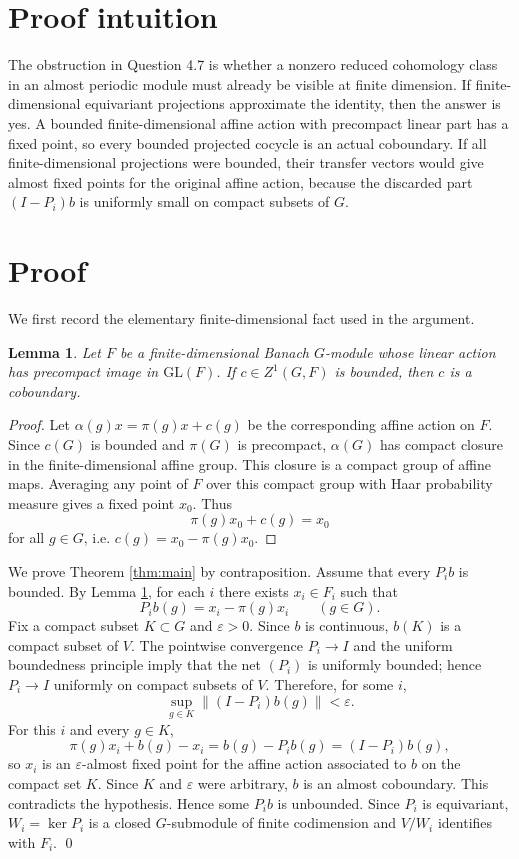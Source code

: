 \documentclass[11pt]{article}
\newtheorem{lemma}{Lemma}
\newcommand{\Zone}{Z^1}
\begin{document}
\section*{Proof intuition}

The obstruction in Question 4.7 is whether a nonzero reduced cohomology class in
an almost periodic module must already be visible at finite dimension.  If
finite-dimensional equivariant projections approximate the identity, then the
answer is yes.  A bounded finite-dimensional affine action with precompact
linear part has a fixed point, so every bounded projected cocycle is an actual
coboundary.  If all finite-dimensional projections were bounded, their transfer
vectors would give almost fixed points for the original affine action, because
the discarded part $(I-P_i)b$ is uniformly small on compact subsets of $G$.

\section*{Proof}

We first record the elementary finite-dimensional fact used in the argument.

\begin{lemma}\label{lem:bounded-fd}
Let $F$ be a finite-dimensional Banach $G$-module whose linear action has
precompact image in $\mathrm{GL}(F)$.  If $c\in \Zone(G,F)$ is bounded, then
$c$ is a coboundary.
\end{lemma}

\begin{proof}
Let $\alpha(g)x=\pi(g)x+c(g)$ be the corresponding affine action on $F$.  Since
$c(G)$ is bounded and $\pi(G)$ is precompact, $\alpha(G)$ has compact closure in
the finite-dimensional affine group.  This closure is a compact group of affine
maps.  Averaging any point of $F$ over this compact group with Haar probability
measure gives a fixed point $x_0$.  Thus
\[
  \pi(g)x_0+c(g)=x_0
\]
for all $g\in G$, i.e. $c(g)=x_0-\pi(g)x_0$.
\end{proof}

We prove Theorem \ref{thm:main} by contraposition.  Assume that every $P_i b$ is
bounded.  By Lemma \ref{lem:bounded-fd}, for each $i$ there exists $x_i\in F_i$
such that
\[
  P_i b(g)=x_i-\pi(g)x_i\qquad(g\in G).
\]
Fix a compact subset $K\subset G$ and $\varepsilon>0$.  Since $b$ is continuous,
$b(K)$ is a compact subset of $V$.  The pointwise convergence $P_i\to I$ and the
uniform boundedness principle imply that the net $(P_i)$ is uniformly bounded;
hence $P_i\to I$ uniformly on compact subsets of $V$.  Therefore, for some $i$,
\[
  \sup_{g\in K}\|(I-P_i)b(g)\|<\varepsilon.
\]
For this $i$ and every $g\in K$,
\[
  \pi(g)x_i+b(g)-x_i
  = b(g)-P_i b(g)
  = (I-P_i)b(g),
\]
so $x_i$ is an $\varepsilon$-almost fixed point for the affine action associated
to $b$ on the compact set $K$.  Since $K$ and $\varepsilon$ were arbitrary, $b$
is an almost coboundary.  This contradicts the hypothesis.  Hence some $P_i b$
is unbounded.  Since $P_i$ is equivariant, $W_i=\ker P_i$ is a closed
$G$-submodule of finite codimension and $V/W_i$ identifies with $F_i$.
\qed
\end{document}
